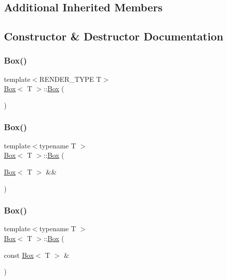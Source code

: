 \subsection*{Additional Inherited Members}


\subsection{Constructor \& Destructor Documentation}
\mbox{\label{classBox_a057f84d8fa68647c6484d4e004d8ab74}} 
\subsubsection{\texorpdfstring{Box()}{Box()}\hspace{0.1cm}{\footnotesize\ttfamily [1/3]}}
{\footnotesize\ttfamily template$<$R\+E\+N\+D\+E\+R\+\_\+\+T\+Y\+PE T$>$ \\
\mbox{\hyperlink{classBox}{Box}}$<$ T $>$\+::\mbox{\hyperlink{classBox}{Box}} (\begin{DoxyParamCaption}{ }\end{DoxyParamCaption})}

\mbox{\label{classBox_af72b67fa2f421acbe9a7d3d1bcd540d1}} 
\subsubsection{\texorpdfstring{Box()}{Box()}\hspace{0.1cm}{\footnotesize\ttfamily [2/3]}}
{\footnotesize\ttfamily template$<$typename T $>$ \\
\mbox{\hyperlink{classBox}{Box}}$<$ T $>$\+::\mbox{\hyperlink{classBox}{Box}} (\begin{DoxyParamCaption}\item[{\mbox{\hyperlink{classBox}{Box}}$<$ T $>$ \&\&}]{ }\end{DoxyParamCaption})\hspace{0.3cm}{\ttfamily [default]}}

\mbox{\label{classBox_aab49a6687d04530ec60421bcbdb929c2}} 
\subsubsection{\texorpdfstring{Box()}{Box()}\hspace{0.1cm}{\footnotesize\ttfamily [3/3]}}
{\footnotesize\ttfamily template$<$typename T $>$ \\
\mbox{\hyperlink{classBox}{Box}}$<$ T $>$\+::\mbox{\hyperlink{classBox}{Box}} (\begin{DoxyParamCaption}\item[{const \mbox{\hyperlink{classBox}{Box}}$<$ T $>$ \&}]{ }\end{DoxyParamCaption})\hspace{0.3cm}{\ttfamily [default]}}



